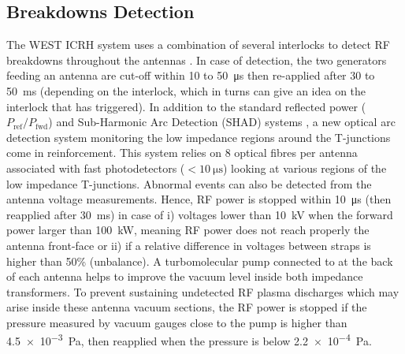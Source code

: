 \documentclass[12p]{iopart}
\begin{document}
\subsection{Breakdowns Detection}
The WEST ICRH system uses a combination of several interlocks to detect RF breakdowns throughout the antennas \cite{hillairet2015-2, helou2020}. In case of detection, the two generators feeding an antenna are cut-off within 10 to \SI{50}{\micro\second} then re-applied after 30 to \SI{50}{\milli\second} (depending on the interlock, which in turns can give an idea on the interlock that has triggered). In addition to the standard reflected power ($P_{\mathrm{ref}}/P_{\mathrm{fwd}}$) and Sub-Harmonic Arc Detection (SHAD) systems \cite{berger-by2007}, a new optical arc detection system monitoring the low impedance regions around the T-junctions come in reinforcement. This system relies on 8 optical fibres per antenna associated with fast photodetectors ($<\SI{10}{\micro\second}$) looking at various regions of the low impedance T-junctions. Abnormal events can also be detected from the antenna voltage measurements. Hence, RF power is stopped within \SI{10}{\micro\second} (then reapplied after \SI{30}{\milli\second}) in case of i) voltages lower than \SI{10}{\kilo\volt} when the forward power larger than \SI{100}{\kilo\watt}, meaning RF power does not reach properly the antenna front-face or ii) if a relative difference in voltages between straps is higher than 50\% (unbalance). A  turbomolecular pump connected to at the back of each antenna helps to improve the vacuum level inside both impedance transformers. To prevent sustaining undetected RF plasma discharges which may arise inside these antenna vacuum sections, the RF power is stopped if the pressure measured by vacuum gauges close to the pump is higher than \SI{4.5e-3}{\pascal}, then reapplied when the pressure is below \SI{2.2e-4}{\pascal}.
\end{document}
